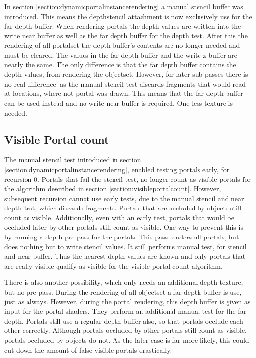 In section \ref{section:dynamicportalinstancerendering} a manual stencil buffer was introduced. This means the depthstencil attachment is now exclusively use for the far depth buffer. When rendering portals the depth values are written into the write near buffer as well as the far depth buffer for the depth test. After this the rendering of all \gls{portalset} the depth buffer's contents are no longer needed and must be cleared. The values in the far depth buffer and the write z buffer are nearly the same. The only difference is that the far depth buffer contains the depth values, from rendering the \gls{objectset}. However, for later sub passes there is no real difference, as the manual stencil test discards fragments that would read at locations, where not portal was drawn. This means that the far depth buffer can be used instead and no write near buffer is required. One less texture is needed.



\subsection{Visible Portal count}
The manual stencil test introduced in section \ref{section:dynamicportalinstancerendering}, enabled testing portals early, for recursion 0. Portals that fail the stencil test, no longer count as visible portals for the algorithm described in section \ref{section:visibleportalcount}.
However, subsequent recursion cannot use early tests, due to the manual stencil and near depth test, which discards fragments. Portals that are occluded by objects still count as visible. Additionally, even with an early test, portals that would be occluded later by other portals still count as visible. One way to prevent this is by running a depth pre pass for the portals. This pass renders all portals, but does nothing but to write stencil values. It still performs manual test, for stencil and near buffer. Thus the nearest depth values are known and only portals that are really visible qualify as visible for the visible portal count algorithm.

There is also another possibility, which only needs an additional depth texture, but no pre pass. During the rendering of all \gls{objectset} a far depth buffer is use, just as always. However, during the portal rendering, this depth buffer is given as input for the portal shaders. They perform an additional manual test for the far depth. Portals still use a regular depth buffer also, so that portals occlude each other correctly. Although portals occluded by other portals still count as visible, portals occluded by objects do not. As the later case is far more likely, this could cut down the amount of false visible portals drastically.


